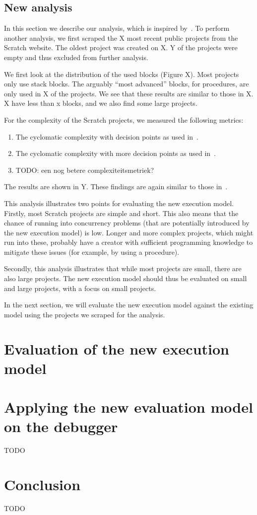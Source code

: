 \documentclass[../main]{subfiles}
\begin{document}
\subsection{New analysis}\label{subsec:new-analysis}

In this section we describe our analysis, which is inspired by~\autocite{aivaloglouHowKidsCode2016}.
To perform another analysis, we first scraped the X most recent public projects from the Scratch website.
The oldest project was created on X.
Y of the projects were empty and thus excluded from further analysis.

We first look at the distribution of the used blocks (Figure X).
Most projects only use stack blocks.
The arguably ``most advanced'' blocks, for procedures, are only used in X of the projects.
We see that these results are similar to those in X.
X have less than x blocks, and we also find some large projects.

For the complexity of the Scratch projects, we measured the following metrics:

\begin{enumerate}
    \item The cyclomatic complexity with decision points as used in~\autocite{aivaloglouHowKidsCode2016}.
    \item The cyclomatic complexity with more decision points as used in~\autocite{fronzaApproachEvaluateComplexity2020}.
    \item TODO: een nog betere complexiteitsmetriek?
\end{enumerate}

The results are shown in Y.
These findings are again similar to those in~\autocite{aivaloglouHowKidsCode2016}.

This analysis illustrates two points for evaluating the new execution model.
Firstly, most Scratch projects are simple and short.
This also means that the chance of running into concurrency problems (that are potentially introduced by the new execution model) is low.
Longer and more complex projects, which might run into these, probably have a creator with sufficient programming knowledge to mitigate these issues (for example, by using a procedure).

Secondly, this analysis illustrates that while most projects are small, there are also large projects.
The new execution model should thus be evaluated on small and large projects, with a focus on small projects.

In the next section, we will evaluate the new execution model against the existing model using the projects we scraped for the analysis.

\section{Evaluation of the new execution model}\label{sec:evaluation-of-the-new-execution-model}




\section{Applying the new evaluation model on the debugger}\label{sec:applying-the-new-evaluation-model-on-the-debugger}

TODO

\section{Conclusion}\label{sec:conclusion}

TODO
\end{document}

